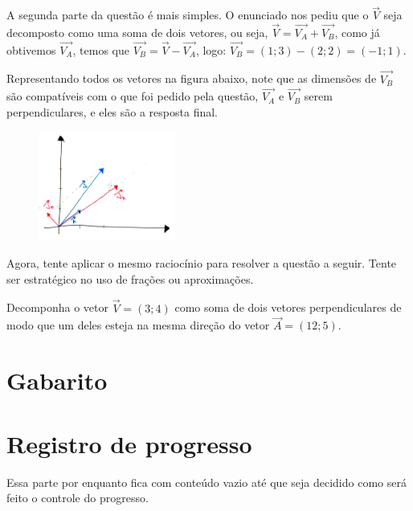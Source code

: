 \documentclass[main.tex]{subfiles}
\begin{document}
A segunda parte da questão é mais simples. O enunciado nos pediu que o $\overrightarrow{V}$ seja decomposto como uma soma de dois vetores, ou seja, $\overrightarrow{V}=\overrightarrow{V_A}+\overrightarrow{V_B}$, como já obtivemos $\overrightarrow{V_A}$, temos que $\overrightarrow{V_B}=\overrightarrow{V}-\overrightarrow{V_A}$, logo: $\overrightarrow{V_B}=(1;3)-(2;2)=(-1;1)$.

Representando todos os vetores na figura abaixo, note que as dimensões de $\overrightarrow{V_B}$ são compatíveis com o que foi pedido pela questão, $\overrightarrow{V_A}$ e $\overrightarrow{V_B}$ serem perpendiculares, e eles são a resposta final.

\begin{figure}[h]
\centering
\includegraphics[width=0.4\textwidth]{./img/c4r3.jpg}
\end{figure}

Agora, tente aplicar o mesmo raciocínio para resolver a questão a seguir. Tente ser estratégico no uso de frações ou aproximações.

\begin{resolva}
Decomponha o vetor $\overrightarrow{V}=(3;4)$ como soma de dois vetores perpendiculares de modo que um deles esteja na mesma direção do vetor $\overrightarrow{A}=(12;5)$.
\end{resolva}

\newpage

\section{Gabarito}

\imprimeGabarito

\section{Registro de progresso}

Essa parte por enquanto fica com conteúdo vazio até que seja decidido como será feito o controle do progresso.
\vspace{5cm}
\end{document}
